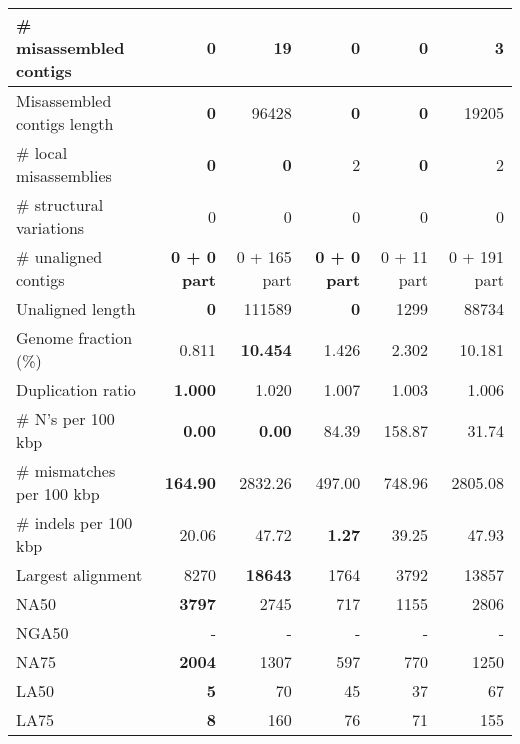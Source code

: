 \documentclass[12pt,a4paper]{article}
\begin{document}
\begin{table}[ht]
\begin{center}
\begin{tabular}{|l*{5}{|r}|}
\# misassembled contigs & {\bf 0} & 19 & {\bf 0} & {\bf 0} & 3 \\ \hline
Misassembled contigs length & {\bf 0} & 96428 & {\bf 0} & {\bf 0} & 19205 \\ \hline
\# local misassemblies & {\bf 0} & {\bf 0} & 2 & {\bf 0} & 2 \\ \hline
\# structural variations & 0 & 0 & 0 & 0 & 0 \\ \hline
\# unaligned contigs & {\bf 0 + 0 part} & 0 + 165 part & {\bf 0 + 0 part} & 0 + 11 part & 0 + 191 part \\ \hline
Unaligned length & {\bf 0} & 111589 & {\bf 0} & 1299 & 88734 \\ \hline
Genome fraction (\%) & 0.811 & {\bf 10.454} & 1.426 & 2.302 & 10.181 \\ \hline
Duplication ratio & {\bf 1.000} & 1.020 & 1.007 & 1.003 & 1.006 \\ \hline
\# N's per 100 kbp & {\bf 0.00} & {\bf 0.00} & 84.39 & 158.87 & 31.74 \\ \hline
\# mismatches per 100 kbp & {\bf 164.90} & 2832.26 & 497.00 & 748.96 & 2805.08 \\ \hline
\# indels per 100 kbp & 20.06 & 47.72 & {\bf 1.27} & 39.25 & 47.93 \\ \hline
Largest alignment & 8270 & {\bf 18643} & 1764 & 3792 & 13857 \\ \hline
NA50 & {\bf 3797} & 2745 & 717 & 1155 & 2806 \\ \hline
NGA50 & - & - & - & - & - \\ \hline
NA75 & {\bf 2004} & 1307 & 597 & 770 & 1250 \\ \hline
LA50 & {\bf 5} & 70 & 45 & 37 & 67 \\ \hline
LA75 & {\bf 8} & 160 & 76 & 71 & 155 \\ \hline
\end{tabular}
\end{center}
\end{table}
\end{document}
